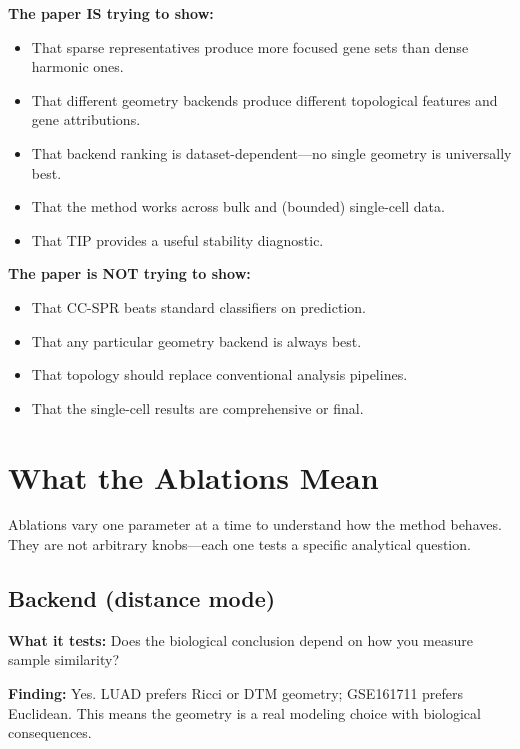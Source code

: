 \documentclass[11pt]{article}
\makeatletter
\newenvironment{keybox}{%
  \par\vspace{8pt}\noindent\fboxrule=1.5pt\fboxsep=8pt%
  \begin{lrbox}{\@tempboxa}\begin{minipage}{\dimexpr\linewidth-2\fboxsep-2\fboxrule}}%
  {\end{minipage}\end{lrbox}\fcolorbox{black}{white}{\usebox{\@tempboxa}}\par\vspace{8pt}}
\makeatother
\begin{document}
\begin{keybox}
\textbf{The paper IS trying to show:}
\begin{itemize}[leftmargin=1em]
\item That sparse representatives produce more focused gene sets than dense harmonic ones.
\item That different geometry backends produce different topological features and gene attributions.
\item That backend ranking is dataset-dependent---no single geometry is universally best.
\item That the method works across bulk and (bounded) single-cell data.
\item That TIP provides a useful stability diagnostic.
\end{itemize}

\textbf{The paper is NOT trying to show:}
\begin{itemize}[leftmargin=1em]
\item That CC-SPR beats standard classifiers on prediction.
\item That any particular geometry backend is always best.
\item That topology should replace conventional analysis pipelines.
\item That the single-cell results are comprehensive or final.
\end{itemize}
\end{keybox}

\section{What the Ablations Mean}
\label{sec:ablations}

Ablations vary one parameter at a time to understand how the method behaves.
They are not arbitrary knobs---each one tests a specific analytical question.

\subsection{Backend (distance mode)}

\textbf{What it tests:} Does the biological conclusion depend on how you measure sample similarity?

\textbf{Finding:} Yes.
LUAD prefers Ricci or DTM geometry; GSE161711 prefers Euclidean.
This means the geometry is a real modeling choice with biological consequences.
\end{document}
